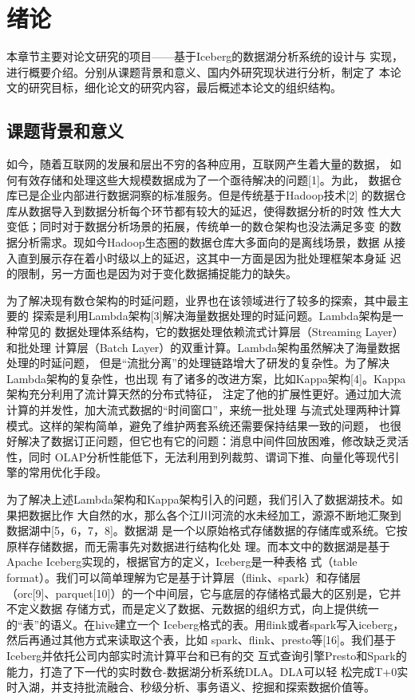 
\chapter{绪论}

本章节主要对论文研究的项目——基于Iceberg的数据湖分析系统的设计与
实现，进行概要介绍。分别从课题背景和意义、国内外研究现状进行分析，制定了
本论文的研究目标，细化论文的研究内容，最后概述本论文的组织结构。

\section{课题背景和意义}

如今，随着互联网的发展和层出不穷的各种应用，互联网产生着大量的数据，
如何有效存储和处理这些大规模数据成为了一个亟待解决的问题[1]。为此，
数据仓库已是企业内部进行数据洞察的标准服务。但是传统基于Hadoop技术[2]
的数据仓库从数据导入到数据分析每个环节都有较大的延迟，使得数据分析的时效
性大大变低；同时对于数据分析场景的拓展，传统单一的数仓架构也没法满足多变
的数据分析需求。现如今Hadoop生态圈的数据仓库大多面向的是离线场景，数据
从接入直到展示存在着小时级以上的延迟，这其中一方面是因为批处理框架本身延
迟的限制，另一方面也是因为对于变化数据捕捉能力的缺失。

为了解决现有数仓架构的时延问题，业界也在该领域进行了较多的探索，其中最主要的
探索是利用Lambda架构[3]解决海量数据处理的时延问题。Lambda架构是一种常见的
数据处理体系结构，它的数据处理依赖流式计算层（Streaming Layer）和批处理
计算层（Batch Layer）的双重计算。Lambda架构虽然解决了海量数据处理的时延问题，
但是“流批分离”的处理链路增大了研发的复杂性。为了解决Lambda架构的复杂性，也出现
有了诸多的改进方案，比如Kappa架构[4]。Kappa架构充分利用了流计算天然的分布式特征，
注定了他的扩展性更好。通过加大流计算的并发性，加大流式数据的“时间窗口”，来统一批处理
与流式处理两种计算模式。这样的架构简单，避免了维护两套系统还需要保持结果一致的问题，
也很好解决了数据订正问题，但它也有它的问题：消息中间件回放困难，修改缺乏灵活性，同时
OLAP分析性能低下，无法利用到列裁剪、谓词下推、向量化等现代引擎的常用优化手段。

为了解决上述Lambda架构和Kappa架构引入的问题，我们引入了数据湖技术。如果把数据比作
大自然的水，那么各个江川河流的水未经加工，源源不断地汇聚到数据湖中[5，6，7，8]。数据湖
是一个以原始格式存储数据的存储库或系统。它按原样存储数据，而无需事先对数据进行结构化处
理。而本文中的数据湖是基于Apache Iceberg实现的，根据官方的定义，Iceberg是一种表格
式（table format）。我们可以简单理解为它是基于计算层（flink、spark）和存储层
（orc[9]、parquet[10]）的一个中间层，它与底层的存储格式最大的区别是，它并不定义数据
存储方式，而是定义了数据、元数据的组织方式，向上提供统一的“表”的语义。在hive建立一个
Iceberg格式的表。用flink或者spark写入iceberg，然后再通过其他方式来读取这个表，比如
spark、flink、presto等[16]。我们基于Iceberg并依托公司内部实时流计算平台和已有的交
互式查询引擎Presto和Spark的能力，打造了下一代的实时数仓-数据湖分析系统DLA。DLA可以轻
松完成T+0实时入湖，并支持批流融合、秒级分析、事务语义、挖掘和探索数据价值等。

